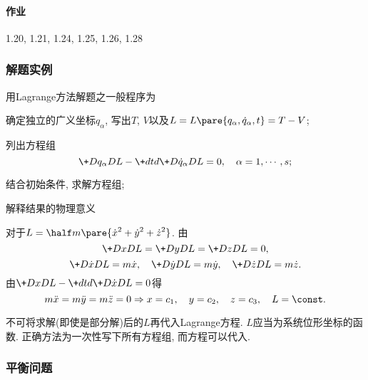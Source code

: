 \documentclass{ctexart}
\begin{document}

\paragraph{作业} %
\label{par:作业}

1.20, 1.21, 1.24, 1.25, 1.26, 1.28



\subsubsection{解题实例} %
\label{ssub:解题实例}

用Lagrange方法解题之一般程序为
\begin{cenum}
    \item 确定独立的广义坐标$q_\alpha$, 写出$T$, $V$以及$L = L\pare{q_\alpha,\dot{q}_\alpha,t} = T-V$;
    \item 列出方程组
    \[ \+D{q_\alpha}D{L} - \+dtd{} \+D{\dot{q}_\alpha}DL = 0,\quad \alpha = 1,\cdots, s; \]
    \item 结合初始条件, 求解方程组;
    \item 解释结果的物理意义
\end{cenum}
\begin{sample}
    \begin{ex}
        对于$L = \displaystyle \half m\pare{\dot{x}^2 + \dot{y}^2 + \dot{z}^2}$. 由
        \[ \+DxDL = \+DyDL = \+DzDL = 0, \]
        \[ \+D{\dot{x}}DL = m\dot{x},\quad \+D{\dot{y}}DL = m\dot{y},\quad \+D{\dot{z}}DL = m\dot{z}. \]
        由$\displaystyle \+DxDL - \+dtd{} \+D{\dot{x}}DL = 0$得
        \[ m\ddot{x} = m\ddot{y} = m\ddot{z} = 0\Rightarrow x = c_1,\quad y=c_2,\quad  z=c_3,\quad L = \const. \]
    \end{ex}
\end{sample}
\begin{pitfall}
    不可将求解(即使是部分解)后的$L$再代入Lagrange方程. $L$应当为系统位形坐标的函数. 正确方法为一次性写下所有方程组, 而方程可以代入.
\end{pitfall}


\subsubsection{平衡问题} %
\label{ssub:平衡问题}
\end{document}

